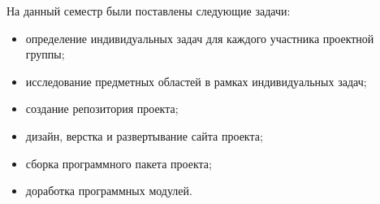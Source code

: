 На данный семестр были поставлены следующие задачи:

\begin{itemize}
  \item определение индивидуальных задач для каждого участника проектной группы;
  \item исследование предметных областей в рамках индивидуальных задач; 
  \item создание репозитория проекта;
  \item дизайн, верстка и развертывание сайта проекта;
  \item сборка программного пакета проекта;   
  \item доработка программных модулей.
\end{itemize}
